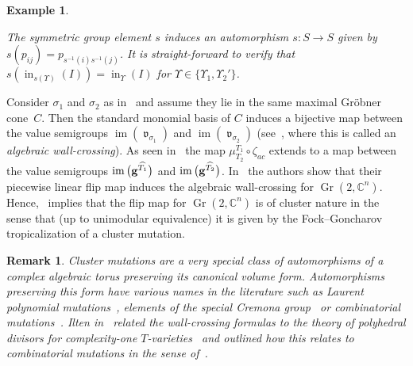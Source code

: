 \documentclass[pdftex]{sigma}%
\newtheorem{Example}[Theorem]{Example}
\newtheorem{Remark}[Theorem]{Remark}}
\numberwithin{equation}{section}
\DeclareMathOperator{\init}{in}
\DeclareMathOperator{\Gr}{Gr}
\DeclareMathOperator{\val}{\mathfrak v}
\begin{document}
\begin{Example}
\begin{center}
 \end{center}
The symmetric group element $s$ induces an automorphism $s\colon S\!\to \!S$ given by $s(p_{ij})\!=p_{s^{-1}(i)s^{-1}(j)}$.
It is straight-forward to verify that $s(\init_{s(\Upsilon)}(I))=\init_{\Upsilon}(I)$ for $\Upsilon\in \{\Upsilon_1,\Upsilon_2'\}$.
\end{Example}

Consider $\sigma_1$ and $\sigma_2$ as in~ and assume they lie in the same maximal Gr\"obner cone~$C$.
Then the standard monomial basis of $C$ induces a bijective map between the value semigroups $\operatorname{im}(\val_{\sigma_1})$ and $\operatorname{im}(\val_{\sigma_2})$ (see~\cite[Section~4.2]{EH-NObodies}, where this is called an {\it algebraic wall-crossing}).
As seen in~ the map $\mu^{T_1}_{T_2}\circ \zeta_{ac}$ extends to a map between the value semigroups $\operatorname{im}\big({\bf g}^{\widehat{T_1}}\big)$ and $\operatorname{im}\big({\bf g}^{\widehat{T_2}}\big)$.
In~\cite[Theorem~5.15]{EH-NObodies} the authors show that their piecewise linear flip map induces the algebraic wall-crossing for $\Gr(2,\mathbb C^n)$.
Hence,~ implies that the flip map for $\Gr(2,\mathbb C^n)$ is of cluster nature in the sense that (up to unimodular equivalence) it is given by the Fock--Goncharov tropicalization of a cluster mutation.

\begin{Remark}
Cluster mutations are a very special class of automorphisms of a complex alge\-braic torus preserving its canonical volume form.
Automorphisms preserving this form have various names in the literature such as {\it Laurent polynomial mutations}~\cite{Ilten_mutation}, elements of the {\it special Cremona group}~\cite{Usn13} or {\it combinatorial mutations}~\cite{ACGK12}.
Ilten in~\cite[Appendix]{EH-NObodies} related the wall-crossing formulas to the theory of polyhedral divisors for complexity-one $T$-varieties~\cite{AH06} and outlined how this relates to combinatorial mutations in the sense of~\cite{ACGK12}.
\end{Remark}




\appendix
\end{document}
